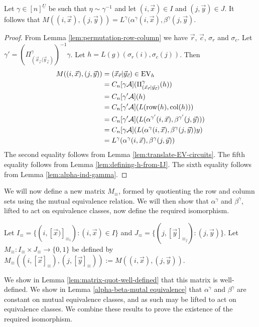 \documentclass[../paper.tex]{subfiles}
\begin{document}
\begin{thm}
  Let $\gamma\in [n]^{\underline{U}}$ be such that $\eta \sim \gamma^{-1}$ and
  let $(i, \vec{x})\in I$ and $(j, \vec{y})\in J$. It follows that $M((i,
  \vec{x}), (j, \vec{y})) = L^{\gamma}(\alpha^{\gamma}(i, \vec{x}),
  \beta^{\gamma}(j, \vec{y})$.
  \label{lem:ML-equal-elements}
\end{thm}
\begin{proof}
  From Lemma \ref{lem:permutation-row-column} we have $\vec{r}$, $\vec{c}$,
  $\sigma_r$ and $\sigma_c$. Let $\gamma' = (\Pi^{\gamma}_{(\vec{x}_{\vec{r}}
    \vert \vec{y}_{\vec{c}})})^{-1} \gamma$. Let $h = L(g)(\sigma_r(i),
  \sigma_c(j))$. Then
  \begin{align*}
    M((i, \vec{x}), (j, \vec{y}))
    &= (\vec{x}_{\vec{r}} \vert \vec{y}_{\vec{c}}) \in \text{EV}_h \\
    &= C_n[\gamma \mathcal{A}] (\Pi^{\gamma}_{(\vec{x}_{\vec{r}} \vert \vec{y}_{\vec{c}})} (h)) \\
    &= C_n[\gamma' \mathcal{A}] (h) \\
    &= C_n[\gamma' \mathcal{A}](L(\text{row}(h), \text{col} (h)))\\
    &= C_n[\gamma' \mathcal{A}](L(\alpha^{\gamma'}(i, \vec{x}), \beta^{\gamma'}(j, \vec{y})))\\
    &= C_n[\gamma \mathcal{A}](L(\alpha^{\gamma}(i, \vec{x}), \beta^{\gamma}(j, \vec{y}))y)\\
    &= L^{\gamma}(\alpha^{\gamma}(i, \vec{x}), \beta^{\gamma}(j, \vec{y}))
  \end{align*}
  The second equality follows from Lemma \ref{lem:translate-EV-circuits}. The
  fifth equality follows from Lemma \ref{lem:defining-h-from-IJ}. The sixth
  equality follows from Lemma \ref{lem:alpha-ind-gamma}.
\end{proof}

We will now define a new matrix $M_{\equiv}$, formed by quotienting the row and
column sets using the mutual equivalence relation. We will then show that
$\alpha^{\gamma}$ and $\beta^{\gamma}$, lifted to act on equivalence classes,
now define the required isomorphism.

Let $I_{\equiv} = \{(i, [\vec{x})]_{\equiv_i}) : (i, \vec{x}) \in I\}$ and
$J_\equiv = \{(j, [\vec{y}]_{\equiv_j}) : (j, \vec{y})\}$. Let $M_{\equiv} :
I_{\equiv} \times J_{\equiv} \rightarrow \{0,1\}$ be defined by $M_\equiv ((i,
[\vec{x}]_\equiv), (j, [\vec{y}]_\equiv)) := M((i,\vec{x}), (j, \vec{y}))$.

We show in Lemma \ref{lem:matrix-quot-well-defined} that this matrix is
well-defined. We show in Lemma \ref{alpha-beta-mutal equivalence} that
$\alpha^{\gamma}$ and $\beta^{\gamma}$ are constant on mutual equivalence
classes, and as such may be lifted to act on equivalence classes. We combine
these results to prove the existence of the required isomorphism.
\end{document}
